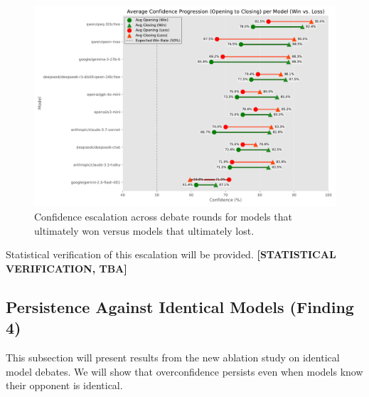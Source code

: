 \documentclass{article}
\begin{document}
\begin{figure}[h]
  \centering
  \includegraphics[width=0.9\linewidth]{figures/model_win_loss_escalation_dumbell.pdf}
  \caption{Confidence escalation across debate rounds for models that ultimately won versus models that ultimately lost.}
  \label{fig:confidence_trend_winner_loser}
\end{figure}

Statistical verification of this escalation will be provided. \textbf{[STATISTICAL VERIFICATION, TBA]}

\subsection{Persistence Against Identical Models (Finding 4)}
This subsection will present results from the new ablation study on identical model debates. We will show that overconfidence persists even when models know their opponent is identical.
\end{document}
